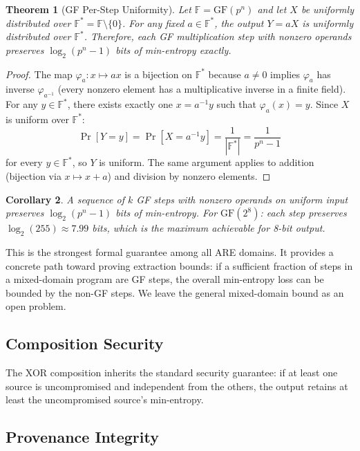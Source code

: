 \documentclass[11pt,a4paper]{article}
\newtheorem{theorem}{Theorem}[section]
\newtheorem{corollary}[theorem]{Corollary}
\newcommand{\are}{\textsc{ARE}\xspace}
\begin{document}
\begin{theorem}[GF Per-Step Uniformity]
\label{thm:gf-uniform}
Let $\mathbb{F} = \mathrm{GF}(p^n)$ and let $X$ be uniformly
distributed over $\mathbb{F}^* = \mathbb{F} \setminus \{0\}$.
%
For any fixed $a \in \mathbb{F}^*$, the output $Y = aX$ is
uniformly distributed over $\mathbb{F}^*$.
%
Therefore, each GF multiplication step with nonzero operands
preserves $\log_2(p^n - 1)$ bits of min-entropy exactly.
\end{theorem}

\begin{proof}
The map $\varphi_a: x \mapsto ax$ is a bijection on
$\mathbb{F}^*$ because $a \neq 0$ implies $\varphi_a$ has inverse
$\varphi_{a^{-1}}$ (every nonzero element has a multiplicative
inverse in a finite field).
%
For any $y \in \mathbb{F}^*$, there exists exactly one
$x = a^{-1}y$ such that $\varphi_a(x) = y$.
%
Since $X$ is uniform over $\mathbb{F}^*$:
\[
  \Pr[Y = y] = \Pr[X = a^{-1}y] = \frac{1}{|\mathbb{F}^*|}
  = \frac{1}{p^n - 1}
\]
for every $y \in \mathbb{F}^*$, so $Y$ is uniform.
%
The same argument applies to addition (bijection via
$x \mapsto x + a$) and division by nonzero elements.
\end{proof}

\begin{corollary}
\label{cor:gf-chain}
A sequence of $k$ GF steps with nonzero operands on uniform input
preserves $\log_2(p^n - 1)$ bits of min-entropy.
%
For $\mathrm{GF}(2^8)$: each step preserves $\log_2(255) \approx
7.99$ bits, which is the maximum achievable for 8-bit output.
\end{corollary}

This is the strongest formal guarantee among all \are domains.
%
It provides a concrete path toward proving extraction bounds:
if a sufficient fraction of steps in a mixed-domain program are
GF steps, the overall min-entropy loss can be bounded by the
non-GF steps.
%
We leave the general mixed-domain bound as an open problem.

\subsection{Composition Security}
\label{sec:security:composition}

The XOR composition inherits the standard security guarantee: if at
least one source is uncompromised and independent from the others, the
output retains at least the uncompromised source's min-entropy.

\subsection{Provenance Integrity}
\label{sec:security:provenance}
\end{document}
